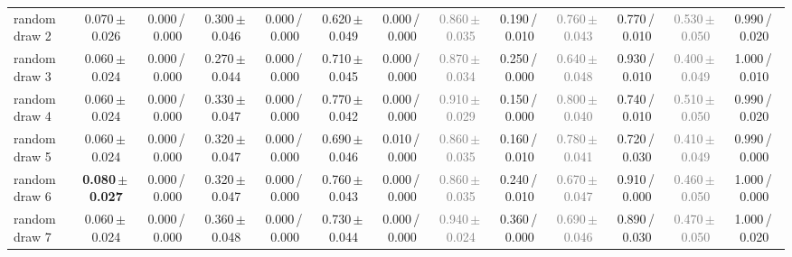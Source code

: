 \begin{tabular}{@{}lcccccccccccc@{}}
random draw 2 & 0.070\,{\scriptsize$\pm$\,0.026} & {\scriptsize 0.000\,/\,0.000} & 0.300\,{\scriptsize$\pm$\,0.046} & {\scriptsize 0.000\,/\,0.000} & 0.620\,{\scriptsize$\pm$\,0.049} & {\scriptsize 0.000\,/\,0.000} & \textcolor{gray}{0.860\,{\scriptsize$\pm$\,0.035}} & {\scriptsize 0.190\,/\,0.010} & \textcolor{gray}{0.760\,{\scriptsize$\pm$\,0.043}} & {\scriptsize 0.770\,/\,0.010} & \textcolor{gray}{0.530\,{\scriptsize$\pm$\,0.050}} & {\scriptsize 0.990\,/\,0.020} \\
random draw 3 & 0.060\,{\scriptsize$\pm$\,0.024} & {\scriptsize 0.000\,/\,0.000} & 0.270\,{\scriptsize$\pm$\,0.044} & {\scriptsize 0.000\,/\,0.000} & 0.710\,{\scriptsize$\pm$\,0.045} & {\scriptsize 0.000\,/\,0.000} & \textcolor{gray}{0.870\,{\scriptsize$\pm$\,0.034}} & {\scriptsize 0.250\,/\,0.000} & \textcolor{gray}{0.640\,{\scriptsize$\pm$\,0.048}} & {\scriptsize 0.930\,/\,0.010} & \textcolor{gray}{0.400\,{\scriptsize$\pm$\,0.049}} & {\scriptsize 1.000\,/\,0.010} \\
random draw 4 & 0.060\,{\scriptsize$\pm$\,0.024} & {\scriptsize 0.000\,/\,0.000} & 0.330\,{\scriptsize$\pm$\,0.047} & {\scriptsize 0.000\,/\,0.000} & 0.770\,{\scriptsize$\pm$\,0.042} & {\scriptsize 0.000\,/\,0.000} & \textcolor{gray}{0.910\,{\scriptsize$\pm$\,0.029}} & {\scriptsize 0.150\,/\,0.000} & \textcolor{gray}{0.800\,{\scriptsize$\pm$\,0.040}} & {\scriptsize 0.740\,/\,0.010} & \textcolor{gray}{0.510\,{\scriptsize$\pm$\,0.050}} & {\scriptsize 0.990\,/\,0.020} \\
\midrule
random draw 5 & 0.060\,{\scriptsize$\pm$\,0.024} & {\scriptsize 0.000\,/\,0.000} & 0.320\,{\scriptsize$\pm$\,0.047} & {\scriptsize 0.000\,/\,0.000} & 0.690\,{\scriptsize$\pm$\,0.046} & {\scriptsize 0.010\,/\,0.000} & \textcolor{gray}{0.860\,{\scriptsize$\pm$\,0.035}} & {\scriptsize 0.160\,/\,0.010} & \textcolor{gray}{0.780\,{\scriptsize$\pm$\,0.041}} & {\scriptsize 0.720\,/\,0.030} & \textcolor{gray}{0.410\,{\scriptsize$\pm$\,0.049}} & {\scriptsize 0.990\,/\,0.000} \\
random draw 6 & \textbf{0.080\,{\scriptsize$\pm$\,0.027}} & {\scriptsize 0.000\,/\,0.000} & 0.320\,{\scriptsize$\pm$\,0.047} & {\scriptsize 0.000\,/\,0.000} & 0.760\,{\scriptsize$\pm$\,0.043} & {\scriptsize 0.000\,/\,0.000} & \textcolor{gray}{0.860\,{\scriptsize$\pm$\,0.035}} & {\scriptsize 0.240\,/\,0.010} & \textcolor{gray}{0.670\,{\scriptsize$\pm$\,0.047}} & {\scriptsize 0.910\,/\,0.000} & \textcolor{gray}{0.460\,{\scriptsize$\pm$\,0.050}} & {\scriptsize 1.000\,/\,0.000} \\
random draw 7 & 0.060\,{\scriptsize$\pm$\,0.024} & {\scriptsize 0.000\,/\,0.000} & 0.360\,{\scriptsize$\pm$\,0.048} & {\scriptsize 0.000\,/\,0.000} & 0.730\,{\scriptsize$\pm$\,0.044} & {\scriptsize 0.000\,/\,0.000} & \textcolor{gray}{0.940\,{\scriptsize$\pm$\,0.024}} & {\scriptsize 0.360\,/\,0.000} & \textcolor{gray}{0.690\,{\scriptsize$\pm$\,0.046}} & {\scriptsize 0.890\,/\,0.030} & \textcolor{gray}{0.470\,{\scriptsize$\pm$\,0.050}} & {\scriptsize 1.000\,/\,0.020} \\

\end{tabular}
